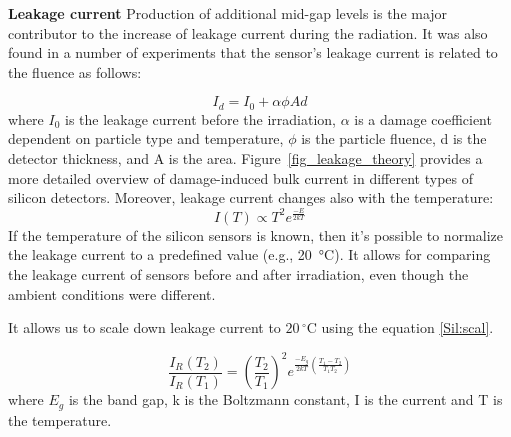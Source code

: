 \textbf{Leakage current}\bigbreak
Production of additional mid-gap levels is the major contributor to the increase of leakage current during the radiation. It was also found in a number of experiments that the sensor's leakage current is related to the fluence as follows:

\begin{equation}
\label{eq:fluence}
    I_{d} = I_{0} + \alpha \phi Ad
\end{equation}
where $I_{0}$ is the leakage current before the irradiation, $\alpha$ is a damage coefficient dependent on particle type and temperature, $\phi$ is the particle fluence, d is the detector thickness, and A is the area. Figure~\ref{fig_leakage_theory} provides a more detailed overview of damage-induced bulk current in different types of silicon detectors. Moreover, leakage current changes also with the temperature:
\begin{equation}
\label{Sil:temp}
    I(T) \propto T^{2}e^{\frac{-E}{2kT}}
\end{equation}
If the temperature of the silicon sensors is known, then it's possible to normalize the leakage current to a predefined value (e.g., \SI{20}{\celsius}). It allows for comparing the leakage current of sensors before and after irradiation, even though the ambient conditions were different. 

It allows us to scale down leakage current to $20\,^{\circ}$C using the equation \ref{Sil:scal}.
 
\begin{equation}
\label{Sil:scal}
    \frac{I_{R}(T_{2})}{I_{R}(T_{1})} = (\frac{T_{2}}{T_{1}})^{2}e^{\frac{-E_{g}}{2kT}(\frac{T_{1}-T_{2}}{T_{1}T_{2}})}
\end{equation}
where $E_{g}$ is the band gap, k is the Boltzmann constant, I is the current and T is the temperature.

